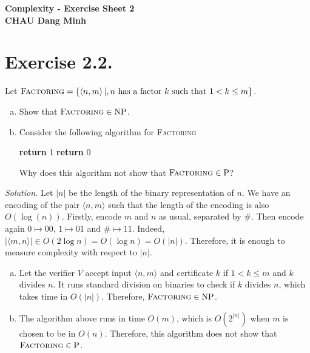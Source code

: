 \begin{center}
  {\bf
    \vspace{0.9cm}
    Complexity - Exercise Sheet 2\\
    \vspace{0.2cm}
    CHAU Dang Minh
  }
\end{center}

\section{Exercise 2.2.} Let $\textsc{Factoring} = \{\langle n,m\rangle \,|, n \text{ has a factor } k \text{ such that } 1 < k \le m\}$.

\begin{enumerate}[(a)]
  \item Show that $\textsc{Factoring} \in \text{NP}$.
  \item Consider the following algorithm for \textsc{Factoring}

        \begin{algorithmic}
          \State \textbf{return} 1
          \EndIf
          \EndFor
          \State \textbf{return} 0
        \end{algorithmic}


        Why does this algorithm not show that $\textsc{Factoring} \in \text{P}$?
\end{enumerate}

\textit{Solution.}
Let $|n|$ be the length of the binary representation of $n$. We have an encoding of the pair $\langle n, m \rangle$ such that the length of the encoding is also $O(\log(n))$. Firstly, encode $m$ and $n$ as usual, separated by $\#$. Then encode again $0\mapsto 00$, $1\mapsto 01$ and $\# \mapsto 11$. Indeed, $|\langle m,n\rangle| \in O(2\log n) = O(\log n) =O(|n|)$. Therefore, it is enough to measure complexity with respect to $|n|$.
\begin{enumerate}[(a)]
  \item Let the verifier $V$ accept input $\langle n, m \rangle$ and certificate $k$ if $1 < k \le m$ and $k$ divides $n$. It runs standard division on binaries to check if $k$ divides $n$, which takes time in $O(|n|)$. Therefore, $\textsc{Factoring}\in \text{NP}$.
  \item The algorithm above runs in time $O(m)$, which is $O(2^{|n|})$ when $m$ is chosen to be in $O(n)$. Therefore, this algorithm does not show that $\textsc{Factoring} \in \text{P}$.
\end{enumerate}

